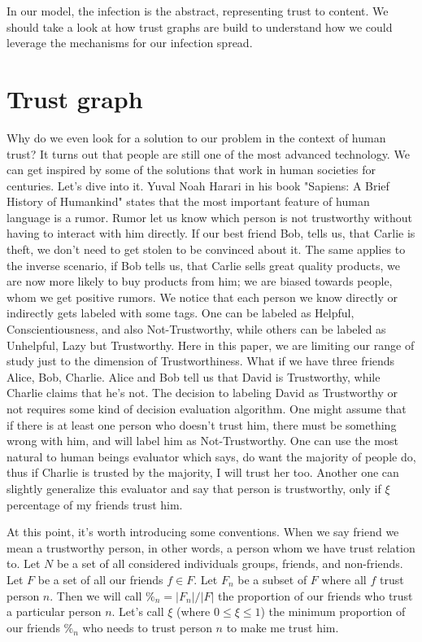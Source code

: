\documentclass[nostrict]{szablonPG}
\begin{document}
In our model, the infection is the abstract, representing trust to content. We should take a look at how trust graphs are build to understand how we could leverage the mechanisms for our infection spread.


\section{Trust graph}
\label{trust-graph}

Why do we even look for a solution to our problem in the context of human trust? It turns out that people are still one of the most advanced technology. We can get inspired by some of the solutions that work in human societies for centuries. Let's dive into it.
Yuval Noah Harari in his book "Sapiens: A Brief History of Humankind" \cite{harari2014sapiens} states that the most important feature of human language is a rumor. Rumor let us know which person is not trustworthy without having to interact with him directly. If our best friend Bob, tells us, that Carlie is theft, we don't need to get stolen to be convinced about it. The same applies to the inverse scenario, if Bob tells us, that Carlie sells great quality products, we are now more likely to buy products from him; we are biased towards people, whom we get positive rumors. We notice that each person we know directly or indirectly gets labeled with some tags. One can be labeled as Helpful, Conscientiousness, and also Not-Trustworthy, while others can be labeled as Unhelpful, Lazy but Trustworthy. Here in this paper, we are limiting our range of study just to the dimension of Trustworthiness.
What if we have three friends Alice, Bob, Charlie. Alice and  Bob tell us that David is Trustworthy, while Charlie claims that he's not. The decision to labeling David as Trustworthy or not requires some kind of decision evaluation algorithm.
One might assume that if there is at least one person who doesn't trust him, there must be something wrong with him, and will label him as Not-Trustworthy. One can use the most natural to human beings evaluator which says, do want the majority of people do, thus if Charlie is trusted by the majority, I will trust her too. Another one can slightly generalize this evaluator and say that person is trustworthy, only if $\xi$ percentage of my friends trust him. 

At this point, it's worth introducing some conventions. When we say friend we mean a trustworthy person, in other words, a person whom we have trust relation to. Let $N$ be a set of all considered individuals groups, friends, and non-friends. Let $F$ be a set of all our friends $f \in F$. Let $F_n$ be a subset of $F$ where all $f$ trust person $n$. Then we will call $\%_n = |F_n|/|F|$ the proportion of our friends who trust a particular person $n$. Let's call $\xi$ (where $0 \le \xi \leq 1$) the minimum proportion of our friends $\%_n$ who needs to trust person $n$ to make me trust him. 
\end{document}

